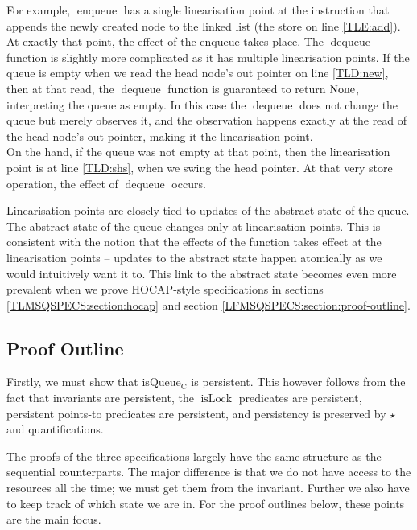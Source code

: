 \documentclass[a4paper, 10pt]{report}
\theoremstyle{definition}
\newcommand{\isLock}{\operatorname{isLock}}
\newcommand{\enqueue}{\operatorname{enqueue}}
\newcommand{\dequeue}{\operatorname{dequeue}}
\newcommand{\isqueueconc}{\operatorname{isQueue_{C}}}
\begin{document}
For example, $\enqueue$ has a single linearisation point at the instruction that appends the newly created node to the linked list (the store on line \ref{TLE:add}). At exactly that point, the effect of the enqueue takes place. The $\dequeue$ function is slightly more complicated as it has multiple linearisation points. If the queue is empty when we read the head node's out pointer on line \ref{TLD:new}, then at that read, the $\dequeue$ function is guaranteed to return $\operatorname{None}$, interpreting the queue as empty. In this case the $\dequeue$ does not change the queue but merely observes it, and the observation happens exactly at the read of the head node's out pointer, making it the linearisation point.\\
On the hand, if the queue was not empty at that point, then the linearisation point is at line \ref{TLD:shs}, when we swing the head pointer. At that very store operation, the effect of $\dequeue$ occurs.

Linearisation points are closely tied to updates of the abstract state of the queue. The abstract state of the queue changes only at linearisation points. This is consistent with the notion that the effects of the function takes effect at the linearisation points -- updates to the abstract state happen atomically as we would intuitively want it to. This link to the abstract state becomes even more prevalent when we prove HOCAP-style specifications in sections \ref{TLMSQSPECS:section:hocap} and section \ref{LFMSQSPECS:section:proof-outline}.

\subsection{Proof Outline}
\label{TLMSQSPECS:concurrent:sub:proof-outline}
Firstly, we must show that $\isqueueconc$ is persistent. This however follows from the fact that invariants are persistent, the $\isLock$ predicates are persistent, persistent points-to predicates are persistent, and persistency is preserved by $\star{}$ and quantifications.

The proofs of the three specifications largely have the same structure as the sequential counterparts. The major difference is that we do not have access to the resources all the time; we must get them from the invariant. Further we also have to keep track of which state we are in. For the proof outlines below, these points are the main focus.
\end{document}
